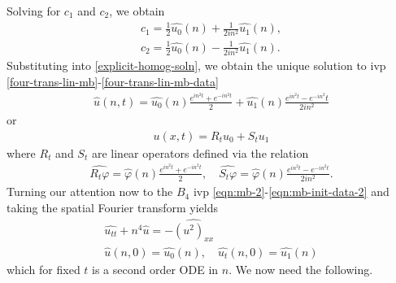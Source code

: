 \documentclass[12pt,reqno]{amsart}
\numberwithin{equation}{section}  %
\numberwithin{figure}{section}
\newcommand{\wh}{\widehat}
\newcommand{\vp}{\varphi}
\theoremstyle{plain}
\theoremstyle{definition}
\theoremstyle{remark}
\begin{document}
%
%
Solving for $c_{1}$ and $c_{2}$, we obtain
%
%
\begin{gather*}
  c_{1} = \frac{1}{2} \wh{u_{0}}(n) + \frac{1}{2in^{2}}\wh{u_{1}}(n),
  \\
  c_{2} = \frac{1}{2} \wh{u_{0}}(n) - \frac{1}{2in^{2}}\wh{u_{1}}(n).
\end{gather*}
%
%
Substituting into \eqref{explicit-homog-soln}, we obtain the unique solution to
ivp \eqref{four-trans-lin-mb}-\eqref{four-trans-lin-mb-data}
%
%
\begin{equation*}
\begin{split}
  \wh{u}(n, t) = \wh{u_{0}}(n) \frac{e^{in^{2}t} + e^{-in^{2}t}}{2} +
  \wh{u_{1}}(n)\frac{e^{in^{2}t} - e^{-in^{2}}t}{2 i n^{2}}
\end{split}
\end{equation*}
%
or
%
%
\begin{equation*}
\begin{split}
  u(x,t) = R_{t}u_{0} + S_{t}u_{1}
\end{split}
\end{equation*}
%
where $R_{t}$ and $S_{t}$ are linear operators defined via the relation
%
%
\begin{gather}
  \label{sin-cos-op}
  \wh{R_{t}\vp} = \wh{\vp}(n) \frac{e^{in^{2}t} + e^{-in^{2}t}}{2} , \quad 
  \wh{S_{t}\vp} = \wh{\vp}(n) \frac{e^{in^{2}t} - e^{-in^{2}t}}{2i n^{2}}.
\end{gather}
%
Turning our attention now to the $B_{4}$ ivp
\eqref{eqn:mb-2}-\eqref{eqn:mb-init-data-2} and taking the spatial Fourier
transform yields 
%
%
\begin{gather}
  \wh{u_{tt}} + n^{4} \wh{u} = -\wh{(u^{2})_{xx}}
  \label{four-trans-mb}
  \\
  \wh{u}(n, 0) = \wh{u_{0}}(n), \quad \wh{u_{t}}(n, 0) = \wh{u_{1}}(n)
  \label{four-trans-mb-data}
\end{gather}
which for fixed $t$ is a second order ODE in $n$. 
We now need the following.
%
%
%
%
%
%
%
%
\end{document}
